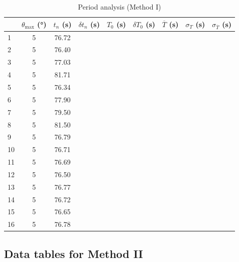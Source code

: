\documentclass[11pt,a4paper]{article}
\newcommand{\head}[1]{\textcolor{calpolypomonagreen}{#1}}
\begin{document}
\begin{table}[H]
  \centering
  \small
  \begin{tabular}{lcccccccc}
    \toprule[0.7mm]
      & \head{$\theta_{\max}$ (\unit{\degree})}
      & \head{$t_n$ (\unit{\s})}
      & \head{$\delta t_n$ (\unit{\s})}
      & \head{$T_0$ (\unit{\s})}
      & \head{$\delta T_0$ (\unit{\s})}
      & \head{$\overline{T}$ (\unit{\s})}
      & \head{$\sigma_T$ (\unit{\s})}
      & \head{$\sigma_{\overline{T}}$ (\unit{\s})} \\
    \midrule
      1  & 5 & 76.72 & & & & & & \\
      2  & 5 & 76.40 & & & & & & \\
      3  & 5 & 77.03 & & & & & & \\
      4  & 5 & 81.71 & & & & & & \\
      5  & 5 & 76.34 & & & & & & \\
      6  & 5 & 77.90 & & & & & & \\
      7  & 5 & 79.50 & & & & & & \\
      8  & 5 & 81.50 & & & & & & \\
      9  & 5 & 76.79 & & & & & & \\
      10 & 5 & 76.71 & & & & & & \\
      11 & 5 & 76.69 & & & & & & \\
      12 & 5 & 76.50 & & & & & & \\
      13 & 5 & 76.77 & & & & & & \\
      14 & 5 & 76.72 & & & & & & \\
      15 & 5 & 76.65 & & & & & & \\
      16 & 5 & 76.78 & & & & & & \\
    \bottomrule[0.7mm]
  \end{tabular}
  \caption{Period analysis (Method I)}
  \label{tab:2}
\end{table}

\subsection{Data tables for Method II}
\end{document}
